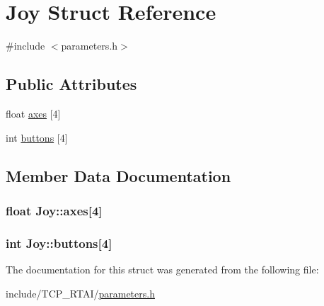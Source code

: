 \hypertarget{structJoy}{
\section{Joy Struct Reference}
\label{structJoy}
}


{\ttfamily \#include $<$parameters.h$>$}

\subsection*{Public Attributes}
\begin{DoxyCompactItemize}
\item 
float \hyperlink{structJoy_a0f514532cd6fb02c781a74ab28228f5d}{axes} \mbox{[}4\mbox{]}
\item 
int \hyperlink{structJoy_a5e97b86b6d8716fc76359509eee5e6ce}{buttons} \mbox{[}4\mbox{]}
\end{DoxyCompactItemize}


\subsection{Member Data Documentation}
\hypertarget{structJoy_a0f514532cd6fb02c781a74ab28228f5d}{
\subsubsection[{axes}]{\setlength{\rightskip}{0pt plus 5cm}float {\bf Joy::axes}\mbox{[}4\mbox{]}}}
\label{structJoy_a0f514532cd6fb02c781a74ab28228f5d}
\hypertarget{structJoy_a5e97b86b6d8716fc76359509eee5e6ce}{
\subsubsection[{buttons}]{\setlength{\rightskip}{0pt plus 5cm}int {\bf Joy::buttons}\mbox{[}4\mbox{]}}}
\label{structJoy_a5e97b86b6d8716fc76359509eee5e6ce}


The documentation for this struct was generated from the following file:\begin{DoxyCompactItemize}
\item 
include/TCP\_\-RTAI/\hyperlink{include_2TCP__RTAI_2parameters_8h}{parameters.h}\end{DoxyCompactItemize}
